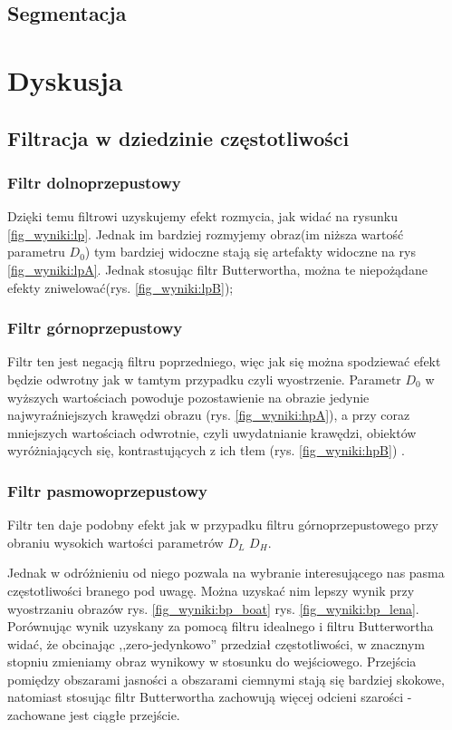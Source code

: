 \documentclass{classrep}
\begin{document}
\subsection{Segmentacja}





\section{Dyskusja}

\subsection{Filtracja w dziedzinie częstotliwości}

\subsubsection{Filtr dolnoprzepustowy}

Dzięki temu filtrowi uzyskujemy efekt rozmycia, jak widać na rysunku \ref{fig_wyniki:lp}. Jednak im bardziej rozmyjemy obraz(im niższa wartość parametru $D_0$) tym bardziej widoczne stają się artefakty widoczne na rys \ref{fig_wyniki:lpA}. Jednak stosując filtr Butterwortha, można te niepożądane efekty zniwelować(rys. \ref{fig_wyniki:lpB});

\subsubsection{Filtr górnoprzepustowy}

Filtr ten jest negacją filtru poprzedniego, więc jak się można spodziewać efekt będzie odwrotny jak w tamtym przypadku czyli wyostrzenie. Parametr $D_0$ w wyższych wartościach powoduje pozostawienie na obrazie jedynie najwyraźniejszych krawędzi obrazu (rys. \ref{fig_wyniki:hpA}), a przy coraz mniejszych wartościach odwrotnie, czyli uwydatnianie krawędzi, obiektów wyróżniających się, kontrastujących z ich tłem (rys. \ref{fig_wyniki:hpB}) .

\subsubsection{Filtr pasmowoprzepustowy}

Filtr ten daje podobny efekt jak w przypadku filtru górnoprzepustowego przy obraniu wysokich wartości parametrów  $D_L$ $D_H$.

Jednak w odróżnieniu od niego pozwala na wybranie interesującego nas pasma częstotliwości branego pod uwagę. Można uzyskać nim lepszy wynik przy wyostrzaniu obrazów  rys. \ref{fig_wyniki:bp_boat}  rys. \ref{fig_wyniki:bp_lena}. Porównując wynik uzyskany za pomocą filtru idealnego i filtru Butterwortha widać, że obcinając ,,zero-jedynkowo'' przedział częstotliwości, w znacznym stopniu zmieniamy obraz wynikowy w stosunku do wejściowego. Przejścia pomiędzy obszarami jasności a obszarami ciemnymi stają się bardziej skokowe, natomiast stosując filtr Butterwortha zachowują więcej odcieni szarości - zachowane jest ciągłe przejście.
\end{document}
